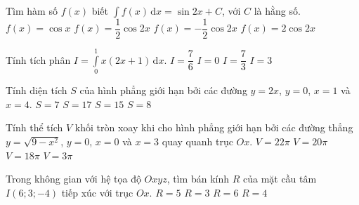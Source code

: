 \begin{ex}%
Tìm hàm số $f(x)$ biết $\displaystyle\int\limits f(x) \mathrm{\,d}x =\sin 2x+C$, với $C$ là hằng số.
\choice
{$f(x)=\cos x$}
{$f(x)=\dfrac{1}{2}\cos 2x$}
{$f(x)=-\dfrac{1}{2}\cos 2x$}
{\True $f(x)=2\cos 2x$}
\end{ex}

\begin{ex}%
Tính tích phân $I=\displaystyle\int\limits_{0}^{1} x(2x+1)\mathrm{\,d}x . $
\choice
{\True $I=\dfrac{7}{6}$}
{$I=0$}
{$I=\dfrac{7}{3}$}
{$I=3$}
\end{ex}

\begin{ex}%
Tính diện tích $S$ của hình phẳng giới hạn bởi các đường $y=2x$, $y=0$, $x=1$ và $x=4$.
\choice
{$S=7$}
{$S=17$}
{\True $S=15$}
{$S=8$}
\end{ex}

\begin{ex}%
Tính thể tích $V$ khối tròn xoay khi cho hình phẳng giới hạn bởi các đường thẳng $y=\sqrt{9-x^2}$, $y=0$, $x=0$ và $x=3$ quay quanh trục $Ox$.
\choice
{$V=22\pi$}
{$V=20\pi$}
{\True $V=18\pi$}
{$V=3\pi$}
\end{ex}

\begin{ex}%
Trong không gian với hệ tọa độ $Oxyz$, tìm bán kính $R$ của mặt cầu tâm $I(6;3;-4)$ tiếp xúc với trục $Ox$.
\choice
{\True $R=5$}
{$R=3$}
{$R=6$}
{$R=4$}
\end{ex}

